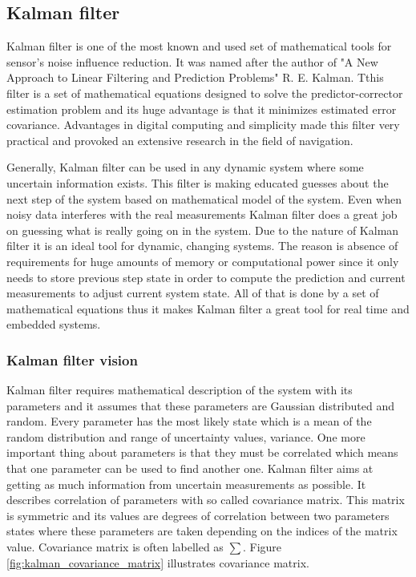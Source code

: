 \documentclass[../../main]{subfiles}
\begin{document}
\subsection{Kalman filter}

Kalman filter is one of the most known and used set of mathematical tools for sensor's noise influence reduction. It was named after the author of "A New Approach to Linear Filtering
and Prediction Problems" \cite{kalman1960} R. E. Kalman. Tthis filter is a set of mathematical equations designed to solve the predictor-corrector estimation problem and its huge advantage is that it minimizes estimated error covariance. Advantages in digital computing and simplicity made this filter very practical and provoked an extensive research in the field of navigation.

Generally, Kalman filter can be used in any dynamic system where some uncertain information exists. This filter is making educated guesses about the next step of the system based on mathematical model of the system. Even when noisy data interferes with the real measurements Kalman filter does a great job on guessing what is really going on in the system.
Due to the nature of Kalman filter it is an ideal tool for dynamic, changing systems. The reason is absence of requirements for huge amounts of memory or computational power since it only needs to store previous step state in order to compute the prediction and current measurements to adjust current system state. All of that is done by a set of mathematical equations thus it makes Kalman filter a great tool for real time and embedded systems.

\subsubsection*{Kalman filter vision}

Kalman filter requires mathematical description of the system with its parameters and it assumes that these parameters are Gaussian distributed and random. Every parameter has the most likely state which is a mean of the random distribution and range of uncertainty values, variance. One more important thing about parameters is that they must be correlated which means that one parameter can be used to find another one. Kalman filter aims at getting as much information from uncertain measurements as possible.
It describes correlation of parameters with so called covariance matrix. This matrix is symmetric and its values are degrees of correlation between two parameters states where these parameters are taken depending on the indices of the matrix value. Covariance matrix is often labelled as $\sum$. Figure \ref{fig:kalman_covariance_matrix} illustrates covariance matrix.
\end{document}
